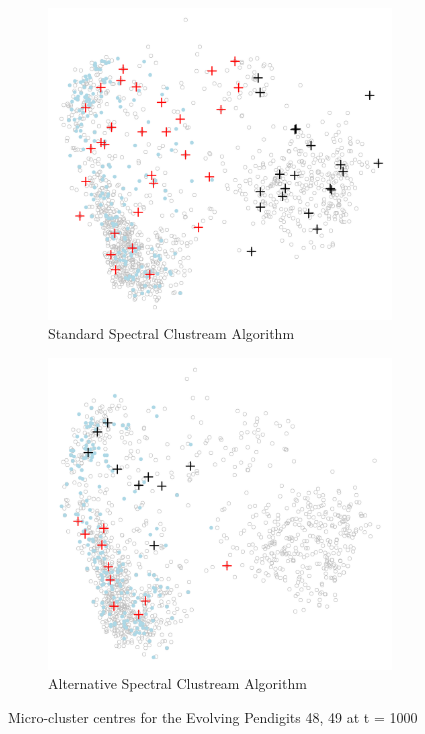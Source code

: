 \begin{figure}
\begin{subfigure}{.5\textwidth}
  \centering
  \includegraphics[width=\textwidth]{evolving_pen/evolving_pen_48_49_100_crop.png}  
  \caption{Standard Spectral Clustream Algorithm}
  \label{fig:stream_1_repeat}
\end{subfigure}
\begin{subfigure}{.5\textwidth}
  \centering
 \includegraphics[width=\textwidth]{evolving_pen/alternative_evolving_pen_48_49_100_crop.png}  
  \caption{Alternative Spectral Clustream Algorithm}
  \label{fig:stream_100_alt}
\end{subfigure}
\caption{Micro-cluster centres for the Evolving Pendigits 48, 49 at t = 1000}
\label{fig:stream_standard_alt}
\end{figure}


